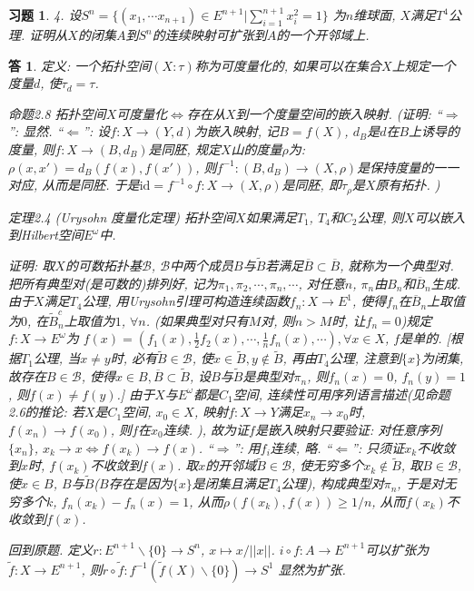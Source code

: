 \documentclass{ctexart}%
\newtheorem*{exercise}{习题}
\newtheorem*{solution}{答}
\theoremstyle{definition}
\theoremstyle{remark}
\begin{document}
\begin{exercise}4. 设$S^n = \{(x_1,\cdots x_{n+1})\in E^{n+1}|\sum_{i=1}^{n+1}x^2_i=1\}$ 为$n$维球面, $X$满足$T^4$公理. 证明从$X$的闭集$A$到$S^n$的连续映射可扩张到$A$的一个开邻域上. 
\end{exercise}
\begin{solution}
定义: 一个拓扑空间$(X:\tau)$称为可度量化的, 如果可以在集合$X$上规定一个度量$d$, 使$\tau_d=\tau$.

命题2.8 拓扑空间$X$可度量化$\Longleftrightarrow$存在从$X$到一个度量空间的嵌入映射. (证明: ``$\Longrightarrow$'': 显然. ``$\Longleftarrow$'': 设$f: X\rightarrow(Y,d)$为嵌入映射, 记$B=f(X)$, $d_B$是$d$在$B$上诱导的度量, 则$f:X\rightarrow(B,d_B)$是同胚, 规定$X$山的度量$\rho$为: $\rho(x,x')=d_B(f(x),f(x'))$, 则$f^{-1}:(B,d_B)\rightarrow (X,\rho)$是保持度量的一一对应, 从而是同胚. 于是$\text{id}=f^{-1}\circ f: X\rightarrow (X,\rho)$是同胚, 即$\tau_\rho$是$X$原有拓扑. )

定理2.4 (Urysohn 度量化定理) 拓扑空间$X$如果满足$T_1$, $T_4$和$C_2$公理, 则$X$可以嵌入到Hilbert空间$E^\omega$中. 

证明: 取$X$的可数拓扑基$\mathscr{B}$, $\mathscr{B}$中两个成员$B$与$\widetilde{B}$若满足$\overline{B}\subset \overline{B}$, 就称为一个典型对. 把所有典型对(是可数的)排列好, 记为$\pi_1,\pi_2,\cdots, \pi_n,\cdots$, 对任意$n$, $\pi_n$由$B_n$和$\overline{B}_n$生成. 由于$X$满足$T_4$公理, 用Urysohn引理可构造连续函数$f_n:X\rightarrow E^1$, 使得$f_n$在$\overline{B}_n$上取值为$0$,  在$\widetilde{B}^c_n$上取值为$1$, $\forall n$. (如果典型对只有$M$对, 则$n>M$时, 让$f_n=0$)规定$f: X\rightarrow E^\omega$为 $f(x)=(f_1(x),\frac{1}{2}f_2(x),\cdots,\frac{1}{n}f_n(x),\cdots), \forall x\in X$, $f$是单的. [根据$T_1$公理, 当$x\neq y$时, 必有$\widetilde{B}\in \mathscr{B}$, 使$x\in \widetilde{B}, y\notin \widetilde{B}$, 再由$T_4$公理, 注意到$\{x\}$为闭集, 故存在$B\in \mathscr{B}$, 使得$x\in B, \overline{B}\subset \widetilde{B}$, 设$B$与$\widetilde{B}$是典型对$\pi_n$, 则$f_n(x)=0$, $f_n(y)=1$, 则$f(x)\neq f(y)$.] 由于$X$与$E^\omega$都是$C_1$空间, 连续性可用序列语言描述(见命题2.6的推论: 若$X$是$C_1$空间, $x_0\in X$, 映射$f:X\rightarrow Y$满足$x_n\rightarrow x_0$时, $f(x_n)\rightarrow f(x_0)$, 则$f$在$x_0$连续. ), 故为证$f$是嵌入映射只要验证: 对任意序列$\{x_n\}$, $x_k\rightarrow x\Longleftrightarrow f(x_k)\rightarrow f(x)$. ``$\Longrightarrow$'': 用$f_i$连续, 略. ``$\Longleftarrow$'': 只须证$x_k$不收敛到$x$时, $f(x_k)$不收敛到$f(x)$. 取$x$的开邻域$\widetilde{B}\in \mathscr{B}$, 使无穷多个$x_k\notin \widetilde{B}$, 取$B\in \mathscr{B}$, 使$x\in B$, $B$与$\widetilde{B}$($B$存在是因为$\{x\}$是闭集且满足$T_4$公理), 构成典型对$\pi_n$, 于是对无穷多个$k$, $f_n(x_k)-f_n(x)=1$, 从而$\rho(f(x_k),f(x))\geq 1/n$, 从而$f(x_k)$不收敛到$f(x)$. 

回到原题. 定义$r:  E^{n+1}\backslash\{0\} \rightarrow S^n$, $x\mapsto x/||x||$.  $i\circ f: A\rightarrow E^{n+1}$可以扩张为$\widetilde{f}: X\rightarrow E^{n+1}$, 则$r\circ \widetilde{f}: f^{-1}(\widetilde{f}(X)\backslash \{0\})\rightarrow S^1$ 显然为扩张.  
\end{solution}
\end{document}
